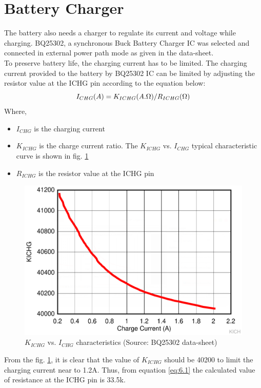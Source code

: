 \section[Battery Charger]{Battery Charger}
 The battery also needs a charger to regulate its current and voltage while charging.
 BQ25302, a synchronous Buck Battery Charger IC was selected and connected in external power path mode as given in the data-sheet.
 \\
 To preserve battery life, the charging current has to be limited. The charging current provided to the battery by BQ25302 IC can be limited by adjusting the resistor value at the ICHG pin according to the equation below:
 \begin{equation}
 	I_{CHG} (A) = K_{ICHG} (A.\ohm) / R_{ICHG} (\ohm)
 	\label{eq:6.1}
 \end{equation}
 Where,
 \begin{itemize}
 	\item $I_{CHG}$ is the charging current
 	\item $K_{ICHG}$ is the charge current ratio.  The $K_{ICHG}$ vs.
 	$I_{CHG}$ typical characteristic curve is shown in fig. \ref{fig:kichg}
 	\item $R_{ICHG}$ is the resistor value at the ICHG pin 
 \end{itemize}
 
  \begin{center}
 	\begin{figure}[h]
 		\centering
 		\includegraphics[width=\columnwidth]{kich.png}
 		\caption[$K_{ICHG}$ vs. $I_{CHG}$ characteristics]{\centering $K_{ICHG}$ vs. $I_{CHG}$ characteristics (Source: BQ25302 data-sheet)}
 		\label{fig:kichg}
 	\end{figure}
 \end{center}
 From the fig. \ref{fig:kichg}, it is clear that the value of $K_{ICHG}$ should be 40200 to limit the charging current near to 1.2A. Thus, from equation \ref{eq:6.1} the calculated value of resistance at the ICHG pin is 33.5k\ohm.
 \\
 
